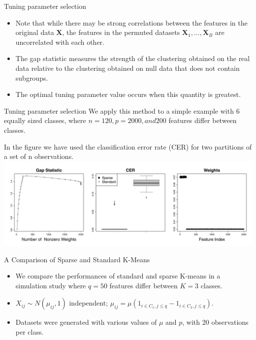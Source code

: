 \documentclass[12pt]{beamer}
\begin{document}
\begin{frame}{Tuning parameter selection}
\begin{itemize}
\item Note that while there may be strong correlations between the
features in the original data $\mathbf{X}$, the features in the permuted
datasets $\mathbf{X}_1, . . . ,\mathbf{X}_B$ are uncorrelated with each other. 
\item The gap
statistic measures the strength of the clustering obtained on the
real data relative to the clustering obtained on null data that does
not contain subgroups.
\item  The optimal tuning parameter value occurs
when this quantity is greatest.
\end{itemize}
\end{frame}

\begin{frame}{Tuning parameter selection}
We apply this method to a simple example with 6
equally sized classes, where $n = 120, p = 2000, and 200$ features
differ between classes.

In the figure we have used the
classification error rate (CER) for two partitions of a set of n
observations.
\includegraphics[scale=0.5]{fig1.png} 
\end{frame}

\begin{frame}{A Comparison of Sparse and Standard
K-Means}
\begin{itemize}
\item We compare the performances of standard and
sparse K-means in a simulation study where $q=50$ features differ between $K=3$ classes.
\item $X_{ij}\sim N(\mu_{ij},1)$ independent; $\mu_{i j}=\mu\left(1_{i \in C_{1}, j \leq q}-1_{i \in C_{2}, j \leq q}\right)$.
\item Datasets were generated with
various values of $\mu$ and $p$, with 20 observations per class.
\end{itemize}
\end{frame}
\end{document}
